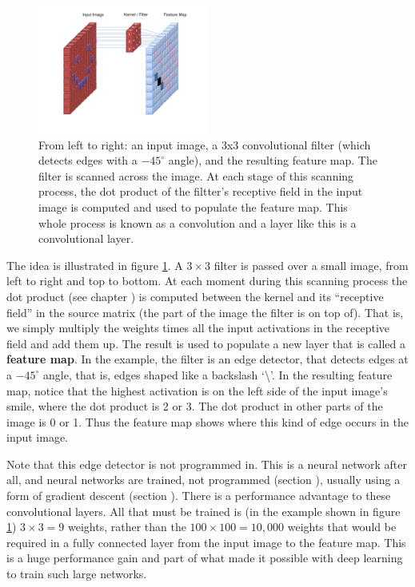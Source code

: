 \begin{figure}[h]
\centering
\includegraphics[width=0.5\textwidth]{images/CNN_Filter.png}
\caption[User Cecbur, \url{https://commons.wikimedia.org/wiki/File:Convolutional_Neural_Network_NeuralNetworkFilter.gif}, with labels added by Jeff Yoshimi.]{From left to right: an input image, a 3x3 convolutional filter (which detects edges with a $-45^\circ$ angle), and the resulting feature map. The filter is scanned across the image. At each stage of this scanning process, the dot product of the filtter's receptive field in the input image is computed and used to populate the feature map. This whole process is known as a convolution and a layer like this is a convolutional layer.}
\label{cnn_filter}
\end{figure}

The idea is illustrated in figure \ref{cnn_filter}. A $3 \times 3$ filter is passed over a small image, from left to right and top to bottom. At each moment during this scanning process the dot product (see chapter ) is computed between the kernel and its ``receptive field'' in the source matrix (the part of the image the filter is on top of). That is, we simply multiply the weights times all the input activations in  the receptive field and  add them up. The result is used to populate a new layer that is called a \textbf{feature map}. In the example, the filter is an edge detector, that detects edges at a $-45^\circ$ angle, that is, edges shaped like a backslash `\textbackslash'. In the resulting feature map, notice that the highest activation is on the left side of the input image's smile, where the dot product is 2 or 3. The dot product in other parts of the image is 0 or 1. Thus the feature map shows where this kind of edge occurs in the input image.

Note that this edge detector is not programmed in. This is a neural network after all, and neural networks are trained, not programmed (section ), usually using a form of gradient descent (section ). There is a performance advantage to these convolutional layers. All that must be trained is (in the example shown in figure \ref{cnn_filter}) $3 \times 3=9$ weights, rather than the $100 \times 100 = 10,000$ weights that would be required in a fully connected layer from the input image to the feature map. This is a huge performance gain and part of what  made it possible with deep learning to train such large networks.

